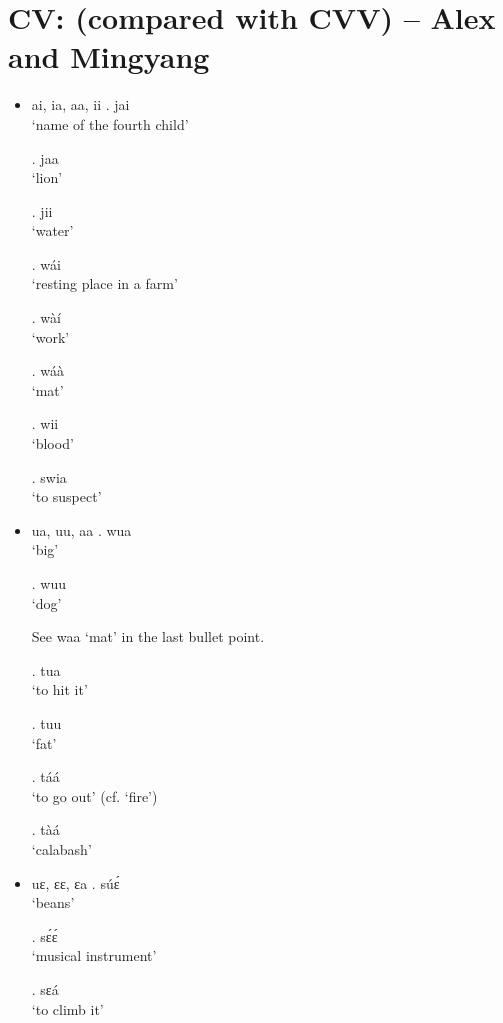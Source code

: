 \documentclass{assets/fieldnotes}
\begin{document}
\section{CV: (compared with CVV) -- Alex and Mingyang}
\begin{itemize}
    \item ai, ia, aa, ii
        \ex. jai\\
            `name of the fourth child'
            
        \ex. jaa\\
            `lion'

        \ex. jii\\
            `water'

        \ex. wái\\
            `resting place in a farm'

        \ex. wàí\\
            `work'
        
        \ex. wáà\\
            `mat'

        \ex. wii\\
            `blood'

        \ex. swia\\
            `to suspect'

        
    \item ua, uu, aa
        \ex. wua\\
            `big'

        \ex. wuu\\
            `dog'

        See waa `mat' in the last bullet point.

        \ex. tua\\
            `to hit it'

        \ex. tuu\\
            `fat'

        \ex. táá\\
            `to go out' (cf. `fire')

        \ex. tàá\\
            `calabash'

    \item uɛ, ɛɛ, ɛa
        \ex. súɛ́\\
            `beans'

        \ex. sɛ́ɛ́\\
            `musical instrument'

        \ex. sɛá\\
            `to climb it'


\end{itemize}
\end{document}

